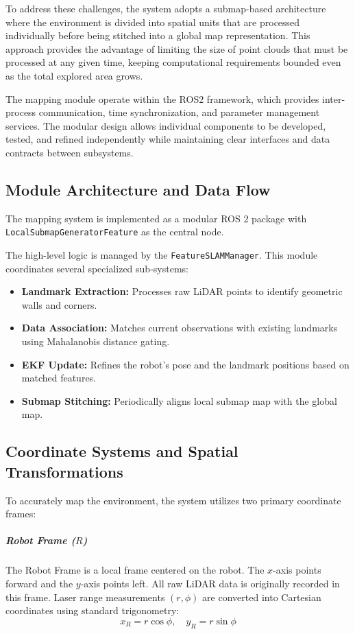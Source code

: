 \documentclass[11pt]{article}
\begin{document}
To address these challenges, the system adopts a submap-based architecture where the environment is divided into spatial units that are processed individually before being stitched into a global map representation. This approach provides the advantage of limiting the size of point clouds that must be processed at any given time, keeping computational requirements bounded even as the total explored area grows.

The mapping module operate within the ROS2 framework, which provides inter-process communication, time synchronization, and parameter management services. The modular design allows individual components to be developed, tested, and refined independently while maintaining clear interfaces and data contracts between subsystems.

\subsection{Module Architecture and Data Flow}

The mapping system is implemented as a modular ROS 2 package with \texttt{LocalSubmapGeneratorFeature} as the central node. 

The high-level logic is managed by the \texttt{FeatureSLAMManager}. This module coordinates several specialized sub-systems:
\begin{itemize}
	\item \textbf{Landmark Extraction:} Processes raw LiDAR points to identify geometric walls and corners.
	\item \textbf{Data Association:} Matches current observations with existing landmarks using Mahalanobis distance gating.
	\item \textbf{EKF Update:} Refines the robot's pose and the landmark positions based on matched features.
	\item \textbf{Submap Stitching:} Periodically aligns local submap map with the global map.
\end{itemize}

\subsection{Coordinate Systems and Spatial Transformations}

To accurately map the environment, the system utilizes two primary coordinate frames:

\subparagraph{Robot Frame ($R$)}
The Robot Frame is a local frame centered on the robot. The $x$-axis points forward and the $y$-axis points left. All raw LiDAR data is originally recorded in this frame. Laser range measurements $(r, \phi)$ are converted into Cartesian coordinates using standard trigonometry:
\begin{equation}
	x_R = r\cos\phi, \quad y_R = r\sin\phi
\end{equation}
\end{document}
